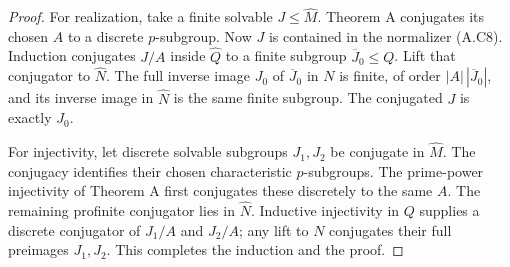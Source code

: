 \begin{proof}
For realization, take a finite solvable $J\leq\widehat M$.
Theorem A conjugates its chosen $A$ to a discrete $p$-subgroup.
Now $J$ is contained in the normalizer (A.C8).  Induction
conjugates $J/A$ inside $\widehat Q$ to a finite subgroup
$\overline J_0\leq Q$.  Lift that conjugator to $\widehat N$.
The full inverse image $J_0$ of $\overline J_0$ in $N$ is
finite, of order $|A|\,|\overline J_0|$, and its inverse image
in $\widehat N$ is the same finite subgroup.  The conjugated
$J$ is exactly $J_0$.

For injectivity, let discrete solvable subgroups $J_1,J_2$ be
conjugate in $\widehat M$.  The conjugacy identifies their
chosen characteristic $p$-subgroups.  The prime-power injectivity
of Theorem A first conjugates these discretely to the same $A$.
The remaining profinite conjugator lies in $\widehat N$.
Inductive injectivity in $Q$ supplies a discrete conjugator of
$J_1/A$ and $J_2/A$; any lift to $N$ conjugates their full
preimages $J_1,J_2$.  This completes the induction and the proof.
\end{proof}

